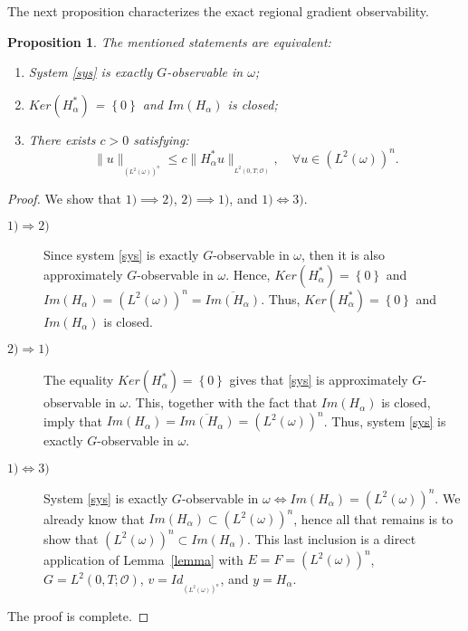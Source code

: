 \documentclass{article}
\newtheorem{proposition}[theorem]{Proposition}
\begin{document}
The next proposition characterizes the exact regional gradient observability.

\begin{proposition}
\label{prp.2}
The mentioned statements are equivalent:
\begin{enumerate}
\item[1-] System \eqref{sys} is exactly $G$-observable in $\omega$;

\item[2-] $Ker\left(H_\alpha^*\right)$ 
= $\left\{0\right\}$ and $Im\left(H_\alpha\right)$ is closed;

\item[3-] There exists $c>0$ satisfying: 
$$
\|u\|_{_{\left(L^2(\omega)\right)^n}} 
\leq c\|H_\alpha^* u\|_{_{L^2(0,T;\mathcal{O})}}, 
\quad \forall u\in \left(L^2(\omega)\right)^n.
$$ 
\end{enumerate}
\end{proposition}

\begin{proof} 
We show that $1)\implies 2)$, $2) \implies 1)$, and $1) \iff 3)$.
\begin{description}
\item[$1)\Rightarrow 2)$] Since system \eqref{sys} is exactly 
$G$-observable in $\omega$, then it is also approximately 
$G$-observable in $\omega$. Hence, 
$Ker\left(H_\alpha^*\right) = \left\{0\right\}$ 
and $Im(H_\alpha) = \left(L^2(\omega)\right)^n 
= \overline{Im(H_\alpha)}$. Thus,  
$Ker\left(H_\alpha^*\right) = \left\{0\right\}$ 
and $Im(H_\alpha) $ is closed.

\item[$2) \Rightarrow 1)$] The equality 
$Ker\left(H_\alpha^*\right) = \left\{0\right\}$ gives that 
\eqref{sys} is approximately $G$-observable in $\omega$. This, 
together with the fact that $Im(H_\alpha)$ is closed, imply 
that $Im(H_\alpha) = \overline{Im(H_\alpha)} 
= \left(L^2(\omega)\right)^n$. Thus, system \eqref{sys} 
is exactly $G$-observable in $\omega$.
 
\item[$1) \Leftrightarrow 3)$] System \eqref{sys} is exactly 
$G$-observable in $\omega \Leftrightarrow Im\left(H_\alpha\right) 
= \left(L^2(\omega)\right)^n$.
We already know that $Im\left(H_\alpha\right) \subset \left(L^2(\omega)\right)^n$, 
hence all that remains is to show that 
$\left(L^2(\omega)\right)^n \subset Im\left(H_\alpha\right)$. 
This last inclusion is a direct application of Lemma~\ref{lemma} 
with $E=F=\left(L^2(\omega)\right)^n$, 
$G=L^2(0,T;\mathcal{O})$, 
$v=Id_{_{\left(L^2(\omega)\right)^n}}$, 
and $y=H_\alpha.$
\end{description}
The proof is complete.
 \end{proof}
\end{document}
